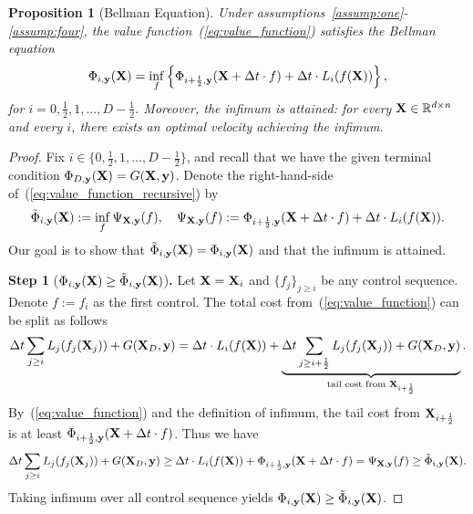\documentclass[journal]{IEEEtran}
\def\eqref#1{equation~\ref{#1}}
\newcommand{\bfX}{{\bf X}}
\newcommand{\bfy}{ {\bf y}}
\renewcommand{\eqref}[1]{(\ref{#1})}
\theoremstyle{plain}
\newtheorem{proposition}[theorem]{Proposition}
\theoremstyle{definition}
\theoremstyle{remark}
\begin{document}
\begin{proposition}[Bellman Equation]\label{prop:Bellman}
    Under assumptions~\ref{assump:one}-\ref{assump:four}, the value function~\eqref{eq:value_function} satisfies the Bellman equation
    \begin{equation}\label{eq:value_function_recursive}
        \Phi_{i, \bfy}(\bfX) = \inf_{f} \left\{ \Phi_{i+\frac{1}{2}, \bfy}(\bfX + \Delta t \cdot f) + \Delta t \cdot L_i(f(\bfX)) \right\},
    \end{equation}
    for $i=0,\frac{1}{2},1,...,D-\frac{1}{2}$. Moreover, the infimum is attained: for every $\bfX \in \mathbb{R}^{d \times n}$ and every $i$, there exists an optimal velocity achieving the infimum.
\end{proposition}

\begin{proof}
    Fix $i \in \{ 0,\frac{1}{2},1,...,D-\frac{1}{2} \}$, and recall that we have the given terminal condition $\Phi_{D, \bfy}(\bfX) = G(\bfX, \bfy)$. Denote the right-hand-side of~\eqref{eq:value_function_recursive} by
    \begin{equation}\label{eq:value_function_recursive_psi}
        \tilde{\Phi}_{i, \bfy}(\bfX) := \inf_f \Psi_{\bfX, \bfy}(f), \quad \Psi_{\bfX, \bfy}(f) :=  \Phi_{i+\frac{1}{2}, \bfy}(\bfX + \Delta t \cdot f) + \Delta t \cdot L_i(f(\bfX)) .
    \end{equation}
    Our goal is to show that $\tilde{\Phi}_{i, \bfy}(\bfX) = {\Phi}_{i, \bfy}(\bfX)$ and that the infimum is attained.

    \textbf{Step 1} (${\Phi}_{i, \bfy}(\bfX) \geq \tilde{\Phi}_{i, \bfy}(\bfX)$)\textbf{.} Let $\bfX=\bfX_i$ and
    $\{ f_j\}_{j \geq i}$ be any control sequence.  Denote $f:=f_i$ as the first control. The total cost from~\eqref{eq:value_function} can be split as follows
    \begin{equation}
        \Delta t \sum_{j \geq i} L_j(f_j(\bfX_j)) + G(\bfX_D, \bfy)  = \Delta t \cdot L_i(f(\bfX)) + \underbrace{\Delta t \sum_{j \geq i+\frac{1}{2}} L_j(f_j(\bfX_j)) + G(\bfX_D, \bfy)}_{\text{tail cost from $\bfX_{i+\frac{1}{2}}$}}. 
    \end{equation}
    By~\eqref{eq:value_function} and the definition of infimum, the tail cost from $\bfX_{i+\frac{1}{2}}$ is at least $\Phi_{i+\frac{1}{2}, \bfy}(\bfX + \Delta t \cdot f)$. Thus we have
    \[
    \Delta t \sum_{j \geq i} L_j(f_j(\bfX_j)) + G(\bfX_D, \bfy) \geq \Delta t \cdot L_i(f(\bfX)) + \Phi_{i+\frac{1}{2}, \bfy}(\bfX + \Delta t \cdot f) = \Psi_{\bfX, \bfy}(f) \geq \tilde{\Phi}_{i, \bfy}(\bfX) .
    \]
    Taking infimum over all control sequence yields ${\Phi}_{i, \bfy}(\bfX) \geq \tilde{\Phi}_{i, \bfy}(\bfX)$.


\end{proof}
\end{document}
